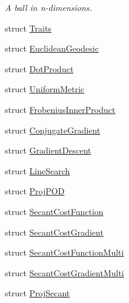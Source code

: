 \begin{DoxyCompactItemize}
\begin{DoxyCompactList}\small\item\em A ball in n-\/dimensions. \end{DoxyCompactList}\item 
struct \hyperlink{struct_d_r_d_s_p_1_1_traits}{Traits}
\item 
struct \hyperlink{struct_d_r_d_s_p_1_1_euclidean_geodesic}{Euclidean\-Geodesic}
\item 
struct \hyperlink{struct_d_r_d_s_p_1_1_dot_product}{Dot\-Product}
\item 
struct \hyperlink{struct_d_r_d_s_p_1_1_uniform_metric}{Uniform\-Metric}
\item 
struct \hyperlink{struct_d_r_d_s_p_1_1_frobenius_inner_product}{Frobenius\-Inner\-Product}
\item 
struct \hyperlink{struct_d_r_d_s_p_1_1_conjugate_gradient}{Conjugate\-Gradient}
\item 
struct \hyperlink{struct_d_r_d_s_p_1_1_gradient_descent}{Gradient\-Descent}
\item 
struct \hyperlink{struct_d_r_d_s_p_1_1_line_search}{Line\-Search}
\item 
struct \hyperlink{struct_d_r_d_s_p_1_1_proj_p_o_d}{Proj\-P\-O\-D}
\item 
struct \hyperlink{struct_d_r_d_s_p_1_1_secant_cost_function}{Secant\-Cost\-Function}
\item 
struct \hyperlink{struct_d_r_d_s_p_1_1_secant_cost_gradient}{Secant\-Cost\-Gradient}
\item 
struct \hyperlink{struct_d_r_d_s_p_1_1_secant_cost_function_multi}{Secant\-Cost\-Function\-Multi}
\item 
struct \hyperlink{struct_d_r_d_s_p_1_1_secant_cost_gradient_multi}{Secant\-Cost\-Gradient\-Multi}
\item 
struct \hyperlink{struct_d_r_d_s_p_1_1_proj_secant}{Proj\-Secant}
\end{DoxyCompactItemize}
